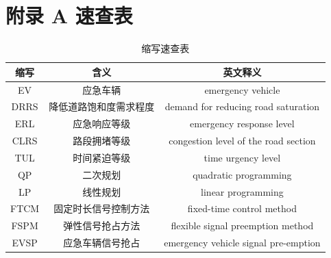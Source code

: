 \chapter*{附录 A 速查表}

\begin{table}[H]
	\centering
	\caption{缩写速查表}
	\label{table:abbreviations}
	\begin{tabular}{|c|c|c|}
		\hline
		缩写 & 含义 & 英文释义 \\ \hline
		EV	 &	应急车辆	  &	emergency vehicle \\ \hline
		DRRS &	降低道路饱和度需求程度	&	demand for reducing road saturation  \\ \hline
		ERL  &  应急响应等级	& emergency response level  \\ \hline
		CLRS &  路段拥堵等级	& congestion level of the road section  \\ \hline
		TUL  &  时间紧迫等级	& time urgency level    \\ \hline
		QP   &  二次规划	  & quadratic programming \\ \hline
		LP   &  线性规划 	  & linear programming \\ \hline
		FTCM &  固定时长信号控制方法 & fixed-time control method \\ \hline
		FSPM &  弹性信号抢占方法 & flexible signal preemption method\cite{min} \\ \hline
		EVSP &  应急车辆信号抢占 & emergency vehicle signal pre-emption\cite{qin_control_2012} \\ \hline
	\end{tabular}
\end{table}


